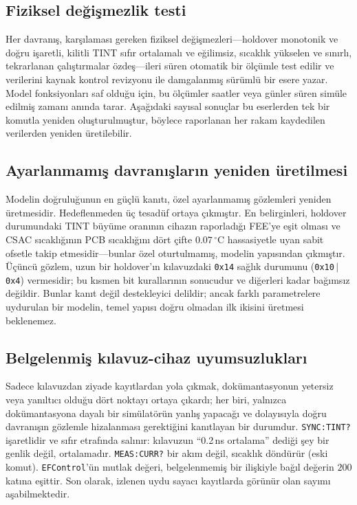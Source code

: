 \documentclass[9pt,twocolumn,a4paper]{extarticle}
\begin{document}
\subsection{Fiziksel değişmezlik testi}
Her davranış, karşılaması gereken fiziksel değişmezleri---holdover monotonik ve doğru işaretli, kilitli TINT sıfır ortalamalı ve eğilimsiz, sıcaklık yükselen ve sınırlı, tekrarlanan çalıştırmalar özdeş---ileri süren otomatik bir ölçümle test edilir ve verilerini kaynak kontrol revizyonu ile damgalanmış sürümlü bir esere yazar. Model fonksiyonları saf olduğu için, bu ölçümler saatler veya günler süren simüle edilmiş zamanı anında tarar. Aşağıdaki sayısal sonuçlar bu eserlerden tek bir komutla yeniden oluşturulmuştur, böylece raporlanan her rakam kaydedilen verilerden yeniden üretilebilir.

\subsection{Ayarlanmamış davranışların yeniden üretilmesi}
Modelin doğruluğunun en güçlü kanıtı, özel ayarlanmamış gözlemleri yeniden üretmesidir. Hedeflenmeden üç tesadüf ortaya çıkmıştır. En belirginleri, holdover durumundaki TINT büyüme oranının cihazın raporladığı FEE'ye eşit olması ve CSAC sıcaklığının PCB sıcaklığını dört çifte $0.07\,^\circ$C hassasiyetle uyan sabit ofsetle takip etmesidir---bunlar özel oturtulmamış, modelin yapısından çıkmıştır. Üçüncü gözlem, uzun bir holdover'ın kılavuzdaki \texttt{0x14} sağlık durumunu (\texttt{0x10}\,$\vert$\,\texttt{0x4}) vermesidir; bu kısmen bit kurallarının sonucudur ve diğerleri kadar bağımsız değildir. Bunlar kanıt değil destekleyici delildir; ancak farklı parametrelere uydurulan bir modelin, temel yapısı doğru olmadan ilk ikisini üretmesi beklenemez.

\subsection{Belgelenmiş kılavuz-cihaz uyumsuzlukları}
Sadece kılavuzdan ziyade kayıtlardan yola çıkmak, dokümantasyonun yetersiz veya yanıltıcı olduğu dört noktayı ortaya çıkardı; her biri, yalnızca dokümantasyona dayalı bir simülatörün yanlış yapacağı ve dolayısıyla doğru davranışın gözlemle hizalanması gerektiğini kanıtlayan bir durumdur. \texttt{SYNC:TINT?} işaretlidir ve sıfır etrafında salınır: kılavuzun ``0.2\,ns ortalama'' dediği şey bir genlik değil, ortalamadır. \texttt{MEAS:CURR?} bir akım değil, sıcaklık döndürür (eski komut). \texttt{EFControl}'ün mutlak değeri, belgelenmemiş bir ilişkiyle bağıl değerin $200$ katına eşittir. Son olarak, izlenen uydu sayacı kayıtlarda görünür olan sayımı aşabilmektedir.
\end{document}
